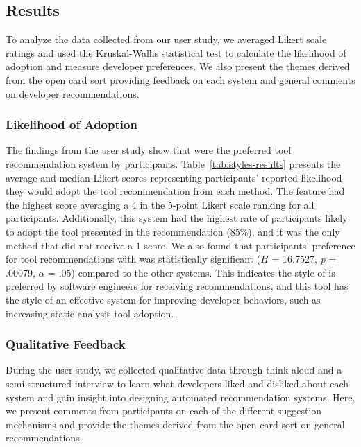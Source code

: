 \subsection{Results}

To analyze the data collected from our user study, we averaged Likert scale ratings and used the Kruskal-Wallis statistical test to calculate the likelihood of adoption and measure developer preferences. We also present the themes derived from the open card sort providing feedback on each system and general comments on developer recommendations.

\subsubsection{Likelihood of Adoption}

The findings from the user study show that \suggs were the preferred tool recommendation system by participants. Table~\ref{tab:styles-results} presents the average and median Likert scores representing participants' reported likelihood they would adopt the tool recommendation from each method.  The \sugg feature had the highest score averaging a 4 in the 5-point Likert scale ranking for all participants. Additionally, this system had the highest rate of participants likely to adopt the tool presented in the recommendation (85\%), and it was the only method that did not receive a 1 score. We also found that participants' preference for tool recommendations with \suggs was statistically significant ($H$ = 16.7527, \textit{p} = .00079, $\alpha$ = .05) compared to the other systems. This indicates the style of \sugg is preferred by software engineers for receiving recommendations, and this tool has the style of an effective system for improving developer behaviors, such as increasing static analysis tool adoption.



\subsubsection{Qualitative Feedback}

During the user study, we collected qualitative data through think aloud and a semi-structured interview to learn what developers liked and disliked about each system and gain insight into designing automated recommendation systems. Here, we present comments from participants on each of the different suggestion mechanisms and provide the themes derived from the open card sort on general recommendations.

